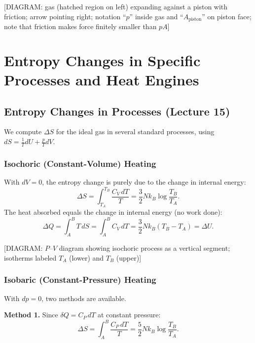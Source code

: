 \begin{center}[DIAGRAM: gas (hatched region on left) expanding against a piston with friction; arrow pointing right; notation ``$p$'' inside gas and ``$A_\text{piston}$'' on piston face; note that friction makes force finitely smaller than $pA$]\end{center}

\chapter{Entropy Changes in Specific Processes and Heat Engines}

\section{Entropy Changes in Processes (Lecture 15)}

We compute $\Delta S$ for the ideal gas in several standard processes, using $dS = \frac{1}{T}dU + \frac{p}{T}dV$.

\subsection{Isochoric (Constant-Volume) Heating}

With $dV = 0$, the entropy change is purely due to the change in internal energy:
\begin{equation}
    \Delta S = \int_{T_A}^{T_B} \frac{C_V\,dT}{T} = \frac{3}{2}Nk_B \log\frac{T_B}{T_A}.
\end{equation}
The heat absorbed equals the change in internal energy (no work done):
\begin{equation}
    \Delta Q = \int_A^B T\,dS = \int_A^B C_V\,dT = \frac{3}{2}Nk_B(T_B - T_A) = \Delta U.
\end{equation}

\begin{center}[DIAGRAM: $P$--$V$ diagram showing isochoric process as a vertical segment; isotherms labeled $T_A$ (lower) and $T_B$ (upper)]\end{center}

\subsection{Isobaric (Constant-Pressure) Heating}

With $dp = 0$, two methods are available.

\textbf{Method 1.} Since $\delta Q = C_P\,dT$ at constant pressure:
\begin{equation}
    \Delta S = \int_A^B \frac{C_P\,dT}{T} = \frac{5}{2}Nk_B \log\frac{T_B}{T_A}.
\end{equation}


